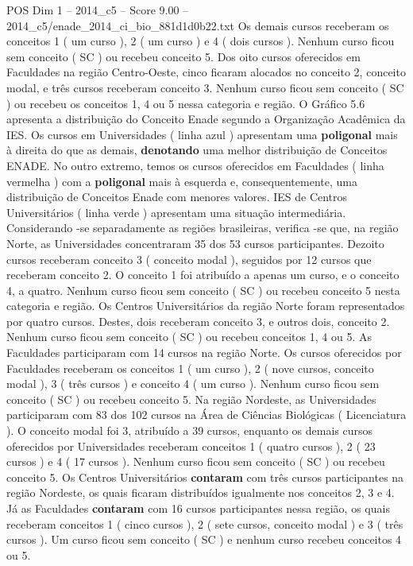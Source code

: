 \begin{textsample}{POS Dim 1 – 2014\_c5 – Score 9.00 – 2014\_c5/enade\_2014\_ci\_bio\_881d1d0b22.txt}
Os demais cursos receberam os conceitos 1 ( um curso ), 2 ( um curso ) e 4 ( dois cursos ).
Nenhum curso ficou sem conceito ( SC ) ou recebeu conceito 5.
Dos oito cursos oferecidos em Faculdades na região Centro-Oeste, cinco ficaram alocados no conceito 2, conceito modal, e três cursos receberam conceito 3.
Nenhum curso ficou sem conceito ( SC ) ou recebeu os conceitos 1, 4 ou 5 nessa categoria e região.
O Gráfico 5.6 apresenta a distribuição do Conceito Enade segundo a Organização Acadêmica da IES.
Os cursos em Universidades ( linha azul ) apresentam uma \textbf{poligonal} mais à direita do que as demais, \textbf{denotando} uma melhor distribuição de Conceitos ENADE.
No outro extremo, temos os cursos oferecidos em Faculdades ( linha vermelha ) com a \textbf{poligonal} mais à esquerda e, consequentemente, uma distribuição de Conceitos Enade com menores valores.
IES de Centros Universitários ( linha verde ) apresentam uma situação intermediária.
Considerando -se separadamente as regiões brasileiras, verifica -se que, na região Norte, as Universidades concentraram 35 dos 53 cursos participantes.
Dezoito cursos receberam conceito 3 ( conceito modal ), seguidos por 12 cursos que receberam conceito 2.
O conceito 1 foi atribuído a apenas um curso, e o conceito 4, a quatro.
Nenhum curso ficou sem conceito ( SC ) ou recebeu conceito 5 nesta categoria e região.
Os Centros Universitários da região Norte foram representados por quatro cursos.
Destes, dois receberam conceito 3, e outros dois, conceito 2.
Nenhum curso ficou sem conceito ( SC ) ou recebeu conceitos 1, 4 ou 5.
As Faculdades participaram com 14 cursos na região Norte.
Os cursos oferecidos por Faculdades receberam os conceitos 1 ( um curso ), 2 ( nove cursos, conceito modal ), 3 ( três cursos ) e conceito 4 ( um curso ).
Nenhum curso ficou sem conceito ( SC ) ou recebeu conceito 5.
Na região Nordeste, as Universidades participaram com 83 dos 102 cursos na Área de Ciências Biológicas ( Licenciatura ).
O conceito modal foi 3, atribuído a 39 cursos, enquanto os demais cursos oferecidos por Universidades receberam conceitos 1 ( quatro cursos ), 2 ( 23 cursos ) e 4 ( 17 cursos ).
Nenhum curso ficou sem conceito ( SC ) ou recebeu conceito 5.
Os Centros Universitários \textbf{contaram} com três cursos participantes na região Nordeste, os quais ficaram distribuídos igualmente nos conceitos 2, 3 e 4.
Já as Faculdades \textbf{contaram} com 16 cursos participantes nessa região, os quais receberam conceitos 1 ( cinco cursos ), 2 ( sete cursos, conceito modal ) e 3 ( três cursos ).
Um curso ficou sem conceito ( SC ) e nenhum curso recebeu conceitos 4 ou 5.

\end{textsample}
